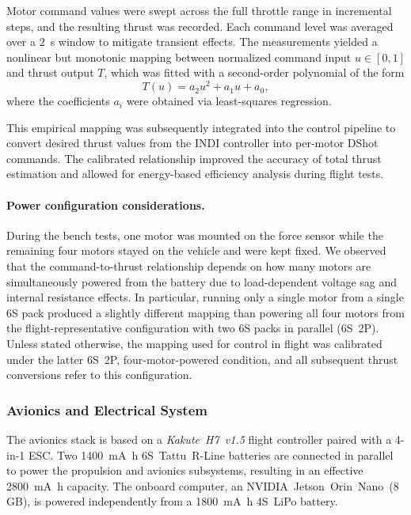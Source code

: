 Motor command values were swept across the full throttle range in incremental steps, and the resulting thrust was recorded.  
Each command level was averaged over a \SI{2}{\second} window to mitigate transient effects.  
The measurements yielded a nonlinear but monotonic mapping between normalized command input $u \in [0,1]$ and thrust output $T$, which was fitted with a second-order polynomial of the form
\begin{equation}
T(u) = a_2 u^2 + a_1 u + a_0,
\end{equation}
where the coefficients $a_i$ were obtained via least-squares regression.

This empirical mapping was subsequently integrated into the control pipeline to convert desired thrust values from the INDI controller into per-motor DShot commands.  
The calibrated relationship improved the accuracy of total thrust estimation and allowed for energy-based efficiency analysis during flight tests.

\paragraph{Power configuration considerations.}
During the bench tests, one motor was mounted on the force sensor while the remaining four motors stayed on the vehicle and were kept fixed. We observed that the command-to-thrust relationship depends on how many motors are simultaneously powered from the battery due to load-dependent voltage sag and internal resistance effects. In particular, running only a single motor from a single 6S pack produced a slightly different mapping than powering all four motors from the flight-representative configuration with two 6S packs in parallel (6S~2P). Unless stated otherwise, the mapping used for control in flight was calibrated under the latter 6S~2P, four-motor-powered condition, and all subsequent thrust conversions refer to this configuration.

\subsubsection{Avionics and Electrical System}
The avionics stack is based on a \textit{Kakute~H7~v1.5} flight controller paired with a 4-in-1 ESC. Two \SI{1400}{\milli\ampere\hour} 6S~Tattu~R-Line batteries are connected in parallel to power the propulsion and avionics subsystems, resulting in an effective \SI{2800}{\milli\ampere\hour} capacity. The onboard computer, an NVIDIA~Jetson~Orin~Nano~(8\,GB), is powered independently from a \SI{1800}{\milli\ampere\hour} 4S~LiPo battery.

